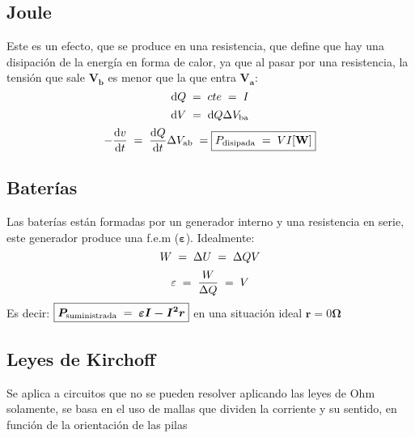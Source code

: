\subsection{Joule}
 Este es un efecto, que se produce en una resistencia, que define que hay una disipación de la energía en forma de calor, ya que al pasar por una resistencia, la tensión que sale \(\bm{V_b}\) es menor que la que entra \(\bm{V_a}\):
\[
        \mathrm{d}Q \hspace{1mm} = \hspace{1mm} cte \hspace{1mm} = \hspace{1mm} I
\]
\[
        \mathrm{d}V \hspace{1mm} = \hspace{1mm} \mathrm{d}Q \Delta V_{\textnormal{ba}}\]
\[
        -\frac{\mathrm{d} v}{\mathrm{d} t} \hspace{1mm} = \hspace{1mm} \frac{\mathrm{d} Q}{\mathrm{d} t}\Delta V_{\textnormal{ab}} \hspace{1mm} = \boxed{P_{\textnormal{disipada}} \hspace{1mm} = \hspace{1mm} V I \textnormal{[\textbf{W}]}}
\]
\subsection{Baterías}
 Las baterías están formadas por un generador interno y una resistencia en serie, este generador produce una f.e.m (\(\bm{\varepsilon}\)). Idealmente:
\[
        W \hspace{1mm} = \hspace{1mm} \Delta U \hspace{1mm} = \hspace{1mm} \Delta QV
\]
\[
        \varepsilon \hspace{1mm} = \hspace{1mm} \frac{W}{\Delta Q} \hspace{1mm} = \hspace{1mm} V
\]
Es decir: \(\boxed{\bm{P_{\textnormal{suministrada}}} \hspace{1mm} = \hspace{1mm} \bm{\varepsilon I - I^2r}}\) en una situación ideal \(\bm{r}=\)0\(\bm{\Omega}\)
\subsection{Leyes de Kirchoff}
 Se aplica a circuitos que no se pueden resolver aplicando las leyes de Ohm solamente, se basa en el uso de mallas que dividen la corriente y su sentido, en función de la orientación de las pilas
